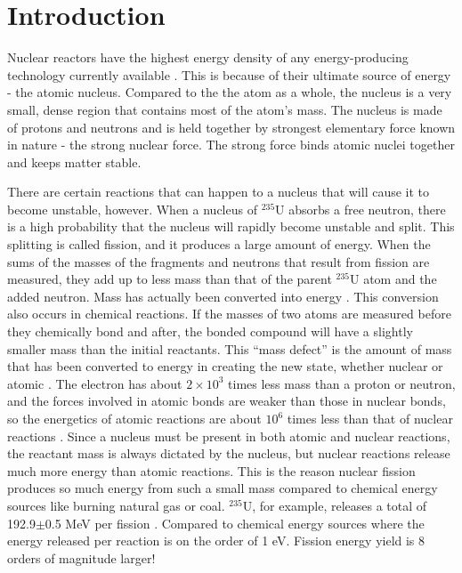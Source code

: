 \chapter{Introduction}

Nuclear reactors have the highest energy density of any energy-producing technology currently available \cite{energy_density}.  This is because of their ultimate source of energy - the atomic nucleus.  Compared to the the atom as a whole, the nucleus is a very small, dense region that contains most of the atom's mass.  The nucleus is made of protons and neutrons and is held together by strongest elementary force known in nature - the strong nuclear force. The strong force binds atomic nuclei together and keeps matter stable.  

There are certain reactions that can happen to a nucleus that will cause it to become unstable, however.  When a nucleus of $^{235}$U absorbs a free neutron, there is a high probability that the nucleus will rapidly become unstable and split.  This splitting is called fission, and it produces a large amount of energy.  When the sums of the masses of the fragments and neutrons that result from fission are measured, they add up to less mass than that of the parent $^{235}$U atom and the added neutron.  Mass has actually been converted into energy \cite{krane, duderstadt}.  This conversion also occurs in chemical reactions.  If the masses of two atoms are measured before they chemically bond and after, the bonded compound will have a slightly smaller mass than the initial reactants.  This ``mass defect'' is the amount of mass that has been converted to energy in creating the new state, whether nuclear or atomic \cite{mass_energy}.  The electron has about $2\times10^3$ times less mass than a proton or neutron, and the forces involved in atomic bonds are weaker than those in nuclear bonds, so the energetics of atomic reactions are about $10^6$ times less than that of nuclear reactions \cite{krane}.  Since a nucleus must be present in both atomic and nuclear reactions, the reactant mass is always dictated by the nucleus, but nuclear reactions release much more energy than atomic reactions.  This is the reason nuclear fission produces so much energy from such a small mass compared to chemical energy sources like burning natural gas or coal.   $^{235}$U, for example, releases a total of 192.9$\pm$0.5 MeV per fission \cite{duderstadt}.  Compared to chemical energy sources where the energy released per reaction is on the order of 1 eV.  Fission energy yield is 8 orders of magnitude larger!      

